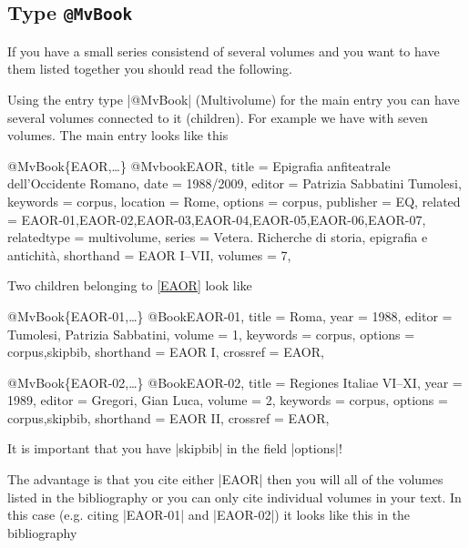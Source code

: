 \documentclass[a4paper,
10pt,
greek,
french,
spanish,
italian,
ngerman,
english
]{ltxdoc}
\begin{document}


\subsection{Type \texttt{@MvBook}}\label{mvbook}
 If you have a small series consistend of several volumes and you want to have them listed together you should read the following.

Using the entry type |@MvBook| (Multivolume) for the main entry you can have several volumes connected to it (children).
For example we have  with seven volumes. 
The main entry looks like this

\begin{bibexample}[label=EAOR]{{@}MvBook\{EAOR,…\}}
@Mvbook{EAOR,
  title       = {Epigrafia anfiteatrale dell'Occidente Romano},
  date        = {1988/2009},
  editor      = {Patrizia Sabbatini Tumolesi},
  keywords    = {corpus},
  location    = Rome, %
  options     = {corpus},
  publisher   = EQ, %
  related     = {EAOR-01,EAOR-02,EAOR-03,EAOR-04,EAOR-05,EAOR-06,EAOR-07},
  relatedtype = {multivolume},
  series      = {Vetera. Richerche di storia, epigrafia e antichità},
  shorthand   = {EAOR I--VII},
  volumes     = {7},
}
\end{bibexample}

Two children belonging to \cref{EAOR} look like

\begin{bibexample}[label=EAOR-01]{{@}MvBook\{EAOR-01,…\}}
@Book{EAOR-01,
  title     = {Roma},
  year      = {1988},
  editor    = {Tumolesi, Patrizia Sabbatini},
  volume    = {1},
  keywords  = {corpus},
  options   = {corpus,skipbib},
  shorthand = {EAOR I},
  crossref = {EAOR},
}
\end{bibexample}

\begin{bibexample}[label=EAOR-02]{{@}MvBook\{EAOR-02,…\}}
@Book{EAOR-02,
  title     = {Regiones Italiae VI--XI},
  year      = {1989},
  editor    = {Gregori, Gian Luca},
  volume    = {2},
  keywords  = {corpus},
  options   = {corpus,skipbib},
  shorthand = {EAOR II},
  crossref = {EAOR},
}
\end{bibexample}
It is important that you have |skipbib| in the field |options|!

The advantage is that you cite either |EAOR| then you will all of the volumes listed in the bibliography 
or you can only cite individual volumes in your text.
In this case (e.g. citing |EAOR-01| and |EAOR-02|) it looks like this in the bibliography 
\end{document}
